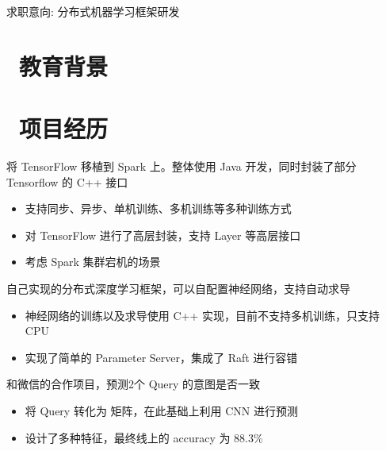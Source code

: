 \documentclass{resume}
\begin{document}

\centerline{求职意向: 分布式机器学习框架研发}



\section{\faGraduationCap\  教育背景}

\section{\faUsers\ 项目经历}
\role{Java, C++, Scala}{}
\begin{onehalfspacing}
将 TensorFlow 移植到 Spark 上。整体使用 Java 开发，同时封装了部分 Tensorflow 的 C++ 接口
\begin{itemize}
  \item 支持同步、异步、单机训练、多机训练等多种训练方式
  \item 对 TensorFlow 进行了高层封装，支持 Layer 等高层接口
  \item 考虑 Spark 集群宕机的场景
\end{itemize}
\end{onehalfspacing}

\begin{onehalfspacing}
自己实现的分布式深度学习框架，可以自配置神经网络，支持自动求导
\begin{itemize}
  \item 神经网络的训练以及求导使用 C++ 实现，目前不支持多机训练，只支持 CPU
  \item 实现了简单的 Parameter Server，集成了 Raft 进行容错
\end{itemize}
\end{onehalfspacing}

\begin{onehalfspacing}
和微信的合作项目，预测2个 Query 的意图是否一致
\begin{itemize}
  \item 将 Query 转化为 矩阵，在此基础上利用 CNN 进行预测
  \item 设计了多种特征，最终线上的 accuracy 为 88.3\%
\end{itemize}
\end{onehalfspacing}
\end{document}
